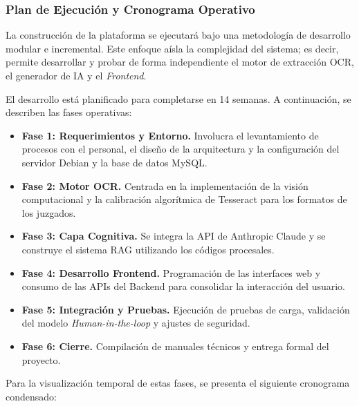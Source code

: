 \subsubsection{Plan de Ejecución y Cronograma Operativo}
\label{subsubsec:plan_ejecucion}

La construcción de la plataforma se ejecutará bajo una metodología de desarrollo modular e incremental. Este enfoque aísla la complejidad del sistema; es decir, permite desarrollar y probar de forma independiente el motor de extracción OCR, el generador de IA y el \textit{Frontend}. 

El desarrollo está planificado para completarse en 14 semanas. A continuación, se describen las fases operativas:

\begin{itemize}
    \item \textbf{Fase 1: Requerimientos y Entorno.} Involucra el levantamiento de procesos con el personal, el diseño de la arquitectura y la configuración del servidor Debian y la base de datos MySQL.
    \item \textbf{Fase 2: Motor OCR.} Centrada en la implementación de la visión computacional y la calibración algorítmica de Tesseract para los formatos de los juzgados.
    \item \textbf{Fase 3: Capa Cognitiva.} Se integra la API de Anthropic Claude y se construye el sistema RAG utilizando los códigos procesales.
    \item \textbf{Fase 4: Desarrollo Frontend.} Programación de las interfaces web y consumo de las APIs del Backend para consolidar la interacción del usuario.
    \item \textbf{Fase 5: Integración y Pruebas.} Ejecución de pruebas de carga, validación del modelo \textit{Human-in-the-loop} y ajustes de seguridad.
    \item \textbf{Fase 6: Cierre.} Compilación de manuales técnicos y entrega formal del proyecto.
\end{itemize}

Para la visualización temporal de estas fases, se presenta el siguiente cronograma condensado:

